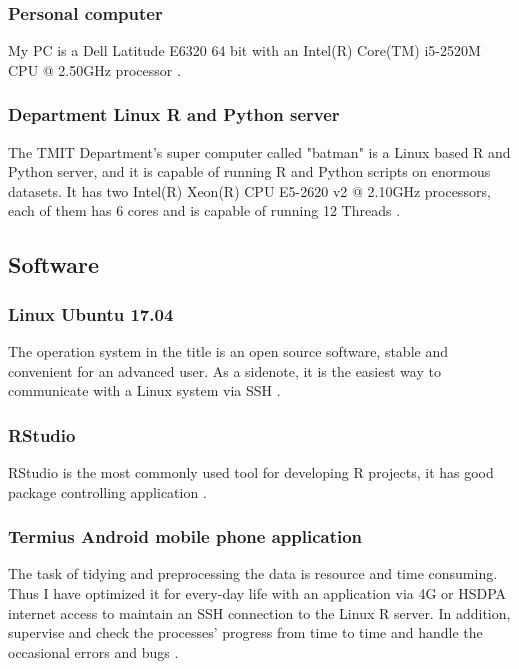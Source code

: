 			\subsubsection{Personal computer}
My PC is a Dell Latitude E6320 64 bit with an Intel(R) Core(TM) i5-2520M CPU @ 2.50GHz processor \cite{Latitude}.
			\subsubsection{Department Linux R and Python server}
The TMIT Department's super computer called "batman" is a Linux based R and Python server, and it is capable of running R and Python scripts on enormous datasets. It has two Intel(R) Xeon(R) CPU E5-2620 v2 @ 2.10GHz processors, each of them has 6 cores and is capable of running 12 Threads \cite{Batman}.
		\subsection{Software}
			\subsubsection{Linux Ubuntu 17.04}
The operation system in the title is an open source software, stable and convenient for an advanced user. As a sidenote, it is the easiest way to communicate with a Linux system \cite{Ubuntu} via SSH \cite{SSH}.
			\subsubsection{RStudio}
RStudio is the most commonly used tool for developing R projects, it has good package controlling application \cite{RStudio}.
			\subsubsection{Termius Android mobile phone application}
The task of tidying \cite{Tidy} and preprocessing the data is resource and time consuming. Thus I have optimized it for every-day life with an application via 4G or HSDPA internet access to maintain an SSH connection to the Linux R server. In addition, supervise and check the processes' progress from time to time and handle the occasional errors and bugs \cite{Termius}.
